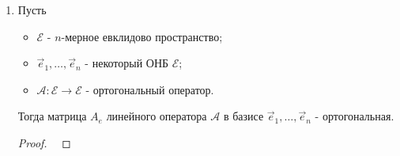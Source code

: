 \begin{enumerate}[label={\arabic*°.}]
\begin{proof}
        \begin{align*}
            (\mathscr{A}\vec{x}, \mathscr{A}\vec{y}) &= (\mathscr{A}(x_1\vec{e}_1 + \ldots + x_n\vec{e}_n), \mathscr{A}(y_1\vec{e}_1 + \ldots + y_n\vec{e}_n)) = \\
            &= (x_1\cdot\mathscr{A}\vec{e}_1 + \ldots + x_n\cdot\mathscr{A}\vec{e}_n, y_1\cdot\mathscr{A}\vec{e}_1 + \ldots + y_n\cdot\mathscr{A}\vec{e}_n) = \\
            &= \left\{ 
            \begin{array}{l}
                \text{Получилось, что} \\
                \text{у вектора } \mathscr{A}\vec{x} \\
                \text{в базисе } \mathscr{A}\vec{e}_1, \ldots, \mathscr{A}\vec{e}_n \\
                \text{координаты } \begin{pmatrix}
                    x_1 \\
                    \vdots \\
                    x_n
                \end{pmatrix}; \\
                \text{у вектора } \vec{y} \text{ аналогично}.
            \end{array} \right\} \underbrace{=}_{\text{Следствие } \ref{corollary:corollary_1}} \\
            &\underbrace{=}_{\text{Следствие } \ref{corollary:corollary_1}} x_1y_1 + \ldots + x_ny_n = (\vec{x}, \vec{y}).
        \end{align*}
    \end{proof}

    \item Пусть 
    
    \begin{itemize}
        \item $\mathcal{E}$ - $n$-мерное евклидово пространство;
        \item $\vec{e}_1, \ldots, \vec{e}_n$ - некоторый ОНБ $\mathcal{E}$;
        \item $\mathscr{A} \colon \mathcal{E} \to \mathcal{E}$ - ортогональный оператор.
    \end{itemize}

    Тогда матрица $A_e$ линейного оператора $\mathscr{A}$ в базисе $\vec{e}_1, \ldots, \vec{e}_n$ - ортогональная.

    \begin{proof}~
    

\end{proof}
\end{enumerate}
